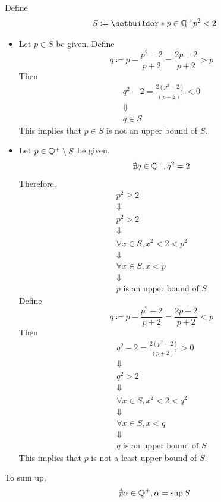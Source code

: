 \bigskip

\begin{example}
    Define
    \[
    S \coloneqq \setbuilder*{p \in \Q^{+}}{p^{2} < 2}
    \]
    \begin{itemize}
        \item Let $p \in S$ be given. Define
        \[
        q \coloneqq p - \frac{p^{2} - 2}{p + 2} = \frac{2p + 2}{p + 2} > p
        \]
        Then
        \[
        \begin{array}{c}
            q^{2} - 2 = \frac{2(p^{2} - 2)}{(p + 2)^{2}} < 0 \\
            \Downarrow \\
            q \in S
        \end{array}
        \]
        This implies that $p \in S$ is not an upper bound of $S$.
        \item Let $p \in \mathbb{Q}^{+} \setminus S$ be given.
        \[
        \nexists q \in \mathbb{Q}^{+}, q^{2} = 2
        \]
        Therefore,
        \[
        \begin{array}{c}
            p^{2} \geq 2 \\
            \Downarrow \\
            p^{2} > 2 \\
            \Downarrow \\
            \forall x \in S, x^{2} < 2 < p^{2} \\
            \Downarrow \\
            \forall x \in S, x < p \\
            \Downarrow \\
            p \text{ is an upper bound of } S
        \end{array}
        \]
        Define
        \[
        q \coloneqq p - \frac{p^{2} - 2}{p + 2} = \frac{2p + 2}{p + 2} < p
        \]
        Then
        \[
        \begin{array}{c}
            q^{2} - 2 = \frac{2(p^{2} - 2)}{(p + 2)^{2}} > 0 \\
            \Downarrow \\
            q^{2} > 2 \\
            \Downarrow \\
            \forall x \in S, x^{2} < 2 < q^{2} \\
            \Downarrow \\
            \forall x \in S, x < q \\
            \Downarrow \\
            q \text{ is an upper bound of } S
        \end{array}
        \]
        This implies that $p$ is not a least upper bound of $S$.
    \end{itemize}
    To sum up,
    \[
    \nexists \alpha \in \mathbb{Q}^{+}, \alpha = \sup S
    \]
\end{example}


